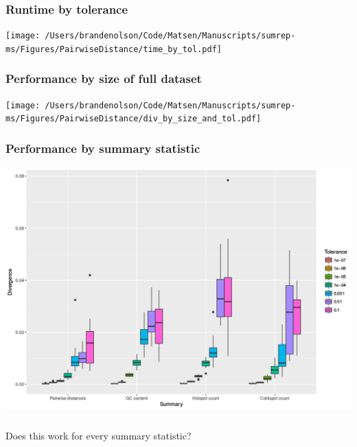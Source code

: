 \documentclass[mathserif,compress]{beamer}
\renewcommand\;{\,}
\begin{document}
\begin{frame}\frametitle{Runtime by tolerance}
\begin{center}
\texttt{[image: /Users/brandenolson/Code/Matsen/Manuscripts/sumrep-ms/Figures/PairwiseDistance/time\_by\_tol.pdf]}
\end{center}
\end{frame}

\begin{frame}\frametitle{Performance by size of full dataset}
\begin{center}
\texttt{[image: /Users/brandenolson/Code/Matsen/Manuscripts/sumrep-ms/Figures/PairwiseDistance/div\_by\_size\_and\_tol.pdf]}
\end{center}
\end{frame}

\begin{frame}\frametitle{Performance by summary statistic}
\begin{center}
\includegraphics[width=\linewidth]{Images/div_by_summary.png}
\end{center}
\end{frame}

\begin{frame}\frametitle{}
\begin{center}
\huge
Does this work for every summary statistic?
\end{center}
\end{frame}
\end{document}
